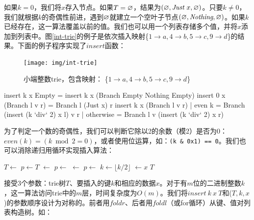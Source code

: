 \documentclass[b5paper]{ctexart}
\begin{document}
如果$k = 0$，我们将$x$存入节点。如果$T = \varnothing$，结果为$(\varnothing, \textit{Just}\ x, \varnothing)$。只要$k \neq 0$，我们就根据$k$的奇偶性前进，遇到$\varnothing$就建立一个空叶子节点$(\varnothing, \textit{Nothing}, \varnothing)$。如果$k$已经存在，这一算法覆盖以前的值。我们也可以用一个列表存储多个值，并将$x$添加到列表中。图\ref{int-trie}的例子是依次插入映射\{$ 1 \rightarrow a, 4 \rightarrow b, 5 \rightarrow c, 9 \rightarrow d$\}的结果。下面的例子程序实现了$insert$函数：

\begin{figure}[htbp]
  \centering
  \texttt{[image: img/int-trie]}
  \caption{小端整数trie，包含映射：
          \{$ 1 \rightarrow a, 4 \rightarrow b, 5 \rightarrow c, 9 \rightarrow d$\}}
  \label{fig:int-trie}
\end{figure}

\begin{Haskell}
insert k x Empty = insert k x (Branch Empty Nothing Empty)
insert 0 x (Branch l v r) = Branch l (Just x) r
insert k x (Branch l v r) | even k    = Branch (insert (k `div` 2) x l) v r
                          | otherwise = Branch l v (insert (k `div` 2) x r)
\end{Haskell}

为了判定一个数的奇偶性，我们可以判断它除以2的余数（模2）是否为0：$even(k) = (k \bmod 2 = 0)$，或者使用位运算，如：\texttt{(k \& 0x1) == 0}。我们也可以消除递归用循环实现插入算法：

\begin{algorithmic}[1]
    \State $T \gets$   
  \EndIf
  \State $p \gets T$
        \State {} $\gets$ 
      \EndIf
      \State $p \gets$ 
    \Else
        \State {} $\gets$ 
      \EndIf
      \State $p \gets$ 
    \EndIf
    \State $k \gets \lfloor k/2 \rfloor$
  \EndWhile
  \State {} $\gets x$
  \State \Return $T$
\EndFunction
\end{algorithmic}

接受3个参数：trie树$T$、要插入的键$k$和相应的数据$x$。对于有$m$位的二进制整数$k$，这一算法访问trie中的$m$层，时间复杂度为$O(m)$。我们将$insert\ k\ x\ T$和($T, k, x$)的参数顺序设计为对称的。前者用$foldr$、后者用$foldl$（或for循环）从键、值对列表构造树。如：
\end{document}
